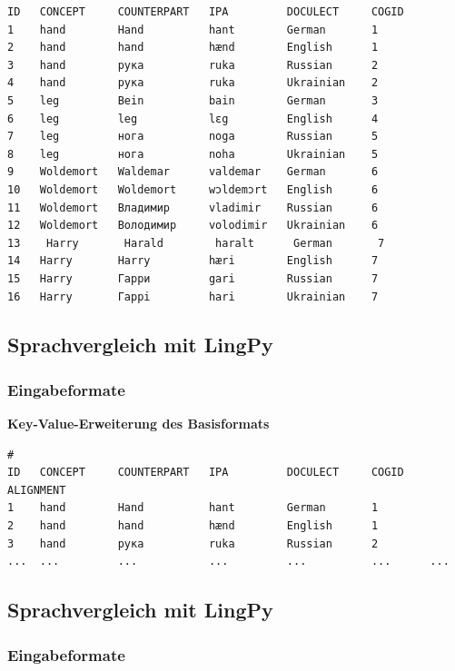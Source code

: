 \begin{verbatim}
ID   CONCEPT     COUNTERPART   IPA         DOCULECT     COGID
1    hand        Hand          hant        German       1
2    hand        hand          hænd        English      1
3    hand        рука          ruka        Russian      2
4    hand        рука          ruka        Ukrainian    2
5    leg         Bein          bain        German       3
6    leg         leg           lɛg         English      4
7    leg         нога          noga        Russian      5
8    leg         нога          noha        Ukrainian    5
9    Woldemort   Waldemar      valdemar    German       6
10   Woldemort   Woldemort     wɔldemɔrt   English      6
11   Woldemort   Владимир      vladimir    Russian      6
12   Woldemort   Володимир     volodimir   Ukrainian    6
13    Harry       Harald        haralt      German       7
14   Harry       Harry         hæri        English      7
15   Harry       Гарри         gari        Russian      7
16   Harry       Гаррi         hari        Ukrainian    7
\end{verbatim}

\subsection{\texorpdfstring{{Sprachvergleich mit
LingPy}}{Sprachvergleich mit LingPy}}

\subsubsection{\texorpdfstring{{Eingabeformate}}{Eingabeformate}}

\textbf{Key-Value-Erweiterung des Basisformats}

\begin{verbatim}
#
ID   CONCEPT     COUNTERPART   IPA         DOCULECT     COGID    ALIGNMENT
1    hand        Hand          hant        German       1        
2    hand        hand          hænd        English      1        
3    hand        рука          ruka        Russian      2        
...  ...         ...           ...         ...          ...      ...
\end{verbatim}

\subsection{\texorpdfstring{{Sprachvergleich mit
LingPy}}{Sprachvergleich mit LingPy}}

\subsubsection{\texorpdfstring{{Eingabeformate}}{Eingabeformate}}

